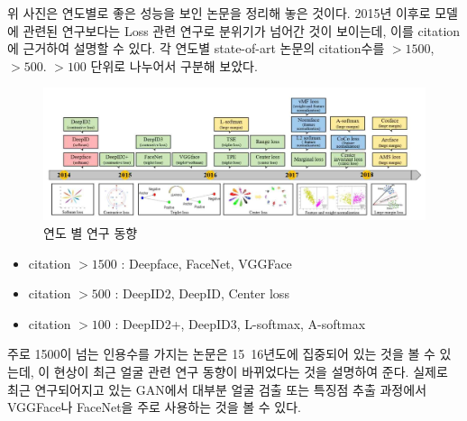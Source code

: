 \documentclass{oblivoir}
\begin{document}
위 사진은 연도별로 좋은 성능을 보인 논문을 정리해 놓은 것이다. 2015년 이후로 모델에 관련된 연구보다는 Loss 관련 연구로 분위기가 넘어간 것이 보이는데, 이를 citation에 근거하여 설명할 수 있다. 각 연도별 state-of-art 논문의 citation수를 $>1500$, $> 500$. $> 100$ 단위로 나누어서 구분해 보았다. 

\begin{figure}[h!]
  \centering
    \includegraphics{pic/chp1/img594}
  \caption{연도 별 연구 동향 \cite{reference6}}
\end{figure}

\begin{itemize}
\item   citation $> 1500$ : Deepface, FaceNet, VGGFace
\item   citation $> 500$  : DeepID2, DeepID, Center loss
\item   citation $> 100$  : DeepID2+, DeepID3, L-softmax, A-softmax
\end{itemize}

주로 1500이 넘는 인용수를 가지는 논문은 15~16년도에 집중되어 있는 것을 볼 수 있는데, 이 현상이 최근 얼굴 관련 연구 동향이 바뀌었다는 것을 설명하여 준다. 실제로 최근 연구되어지고 있는 GAN에서 대부분 얼굴 검출 또는 특징점 추출 과정에서 VGGFace나 FaceNet을 주로 사용하는 것을 볼 수 있다. 
\end{document}
